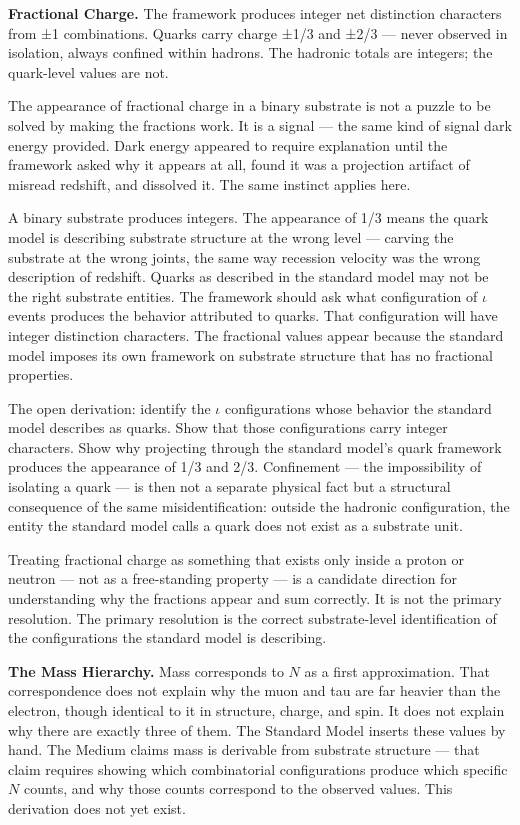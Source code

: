 \documentclass[11pt,letterpaper]{article}
\begin{document}
\textbf{Fractional Charge.} The framework produces integer net distinction characters from ±1 combinations. Quarks carry charge ±1/3 and ±2/3 --- never observed in isolation, always confined within hadrons. The hadronic totals are integers; the quark-level values are not.

The appearance of fractional charge in a binary substrate is not a puzzle to be solved by making the fractions work. It is a signal --- the same kind of signal dark energy provided. Dark energy appeared to require explanation until the framework asked why it appears at all, found it was a projection artifact of misread redshift, and dissolved it. The same instinct applies here.

A binary substrate produces integers. The appearance of 1/3 means the quark model is describing substrate structure at the wrong level --- carving the substrate at the wrong joints, the same way recession velocity was the wrong description of redshift. Quarks as described in the standard model may not be the right substrate entities. The framework should ask what configuration of \(\iota\) events produces the behavior attributed to quarks. That configuration will have integer distinction characters. The fractional values appear because the standard model imposes its own framework on substrate structure that has no fractional properties.

The open derivation: identify the \(\iota\) configurations whose behavior the standard model describes as quarks. Show that those configurations carry integer characters. Show why projecting through the standard model's quark framework produces the appearance of 1/3 and 2/3. Confinement --- the impossibility of isolating a quark --- is then not a separate physical fact but a structural consequence of the same misidentification: outside the hadronic configuration, the entity the standard model calls a quark does not exist as a substrate unit.

Treating fractional charge as something that exists only inside a proton or neutron --- not as a free-standing property --- is a candidate direction for understanding why the fractions appear and sum correctly. It is not the primary resolution. The primary resolution is the correct substrate-level identification of the configurations the standard model is describing.

\textbf{The Mass Hierarchy.} Mass corresponds to \(N\) as a first approximation. That correspondence does not explain why the muon and tau are far heavier than the electron, though identical to it in structure, charge, and spin. It does not explain why there are exactly three of them. The Standard Model inserts these values by hand. The Medium claims mass is derivable from substrate structure --- that claim requires showing which combinatorial configurations produce which specific \(N\) counts, and why those counts correspond to the observed values. This derivation does not yet exist.
\end{document}
